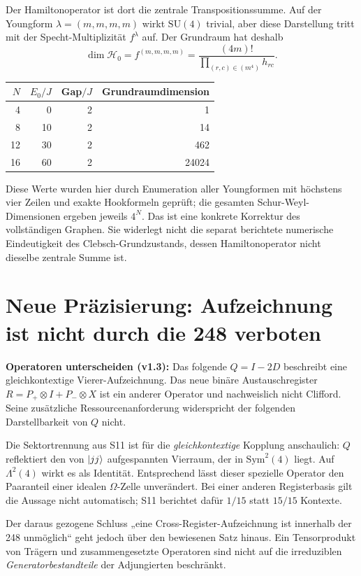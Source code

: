 Der Hamiltonoperator ist dort die zentrale Transpositionssumme. Auf der Youngform $\lambda=(m,m,m,m)$ wirkt $\mathrm{SU}(4)$ trivial, aber diese Darstellung tritt mit der Specht-Multiplizität $f^\lambda$ auf. Der Grundraum hat deshalb
\begin{equation}
\dim\mathcal H_0=f^{(m,m,m,m)}
=\frac{(4m)!}{\prod_{(r,c)\in(m^4)}h_{rc}}.
\end{equation}
\begin{center}
\begin{tabular}{rrrr}
\toprule $N$&$E_0/J$&Gap$/J$&Grundraumdimension\\\midrule
4&0&2&1\\8&10&2&14\\12&30&2&462\\16&60&2&24024\\\bottomrule
\end{tabular}
\end{center}
Diese Werte wurden hier durch Enumeration aller Youngformen mit höchstens vier Zeilen und exakte Hookformeln geprüft; die gesamten Schur-Weyl-Dimensionen ergeben jeweils $4^N$. Das ist eine konkrete Korrektur des vollständigen Graphen. Sie widerlegt nicht die separat berichtete numerische Eindeutigkeit des Clebsch-Grundzustands, dessen Hamiltonoperator nicht dieselbe zentrale Summe ist.

\section{Neue Präzisierung: Aufzeichnung ist nicht durch die 248 verboten}
\textbf{Operatoren unterscheiden (v1.3):} Das folgende $Q=I-2D$ beschreibt eine gleichkontextige Vierer-Aufzeichnung. Das neue binäre Austauschregister $R=P_+\otimes I+P_-\otimes X$ ist ein anderer Operator und nachweislich nicht Clifford. Seine zusätzliche Ressourcenanforderung widerspricht der folgenden Darstellbarkeit von $Q$ nicht.

Die Sektortrennung aus S11 ist für die \emph{gleichkontextige} Kopplung anschaulich: $Q$ reflektiert den von $\lvert jj\rangle$ aufgespannten Vierraum, der in $\mathrm{Sym}^2(4)$ liegt. Auf $\Lambda^2(4)$ wirkt es als Identität. Entsprechend lässt dieser spezielle Operator den Paaranteil einer idealen $\Omega$-Zelle unverändert. Bei einer anderen Registerbasis gilt die Aussage nicht automatisch; S11 berichtet dafür $1/15$ statt $15/15$ Kontexte.

Der daraus gezogene Schluss „eine Cross-Register-Aufzeichnung ist innerhalb der 248 unmöglich“ geht jedoch über den bewiesenen Satz hinaus. Ein Tensorprodukt von Trägern und zusammengesetzte Operatoren sind nicht auf die irreduziblen \emph{Generatorbestandteile} der Adjungierten beschränkt.

